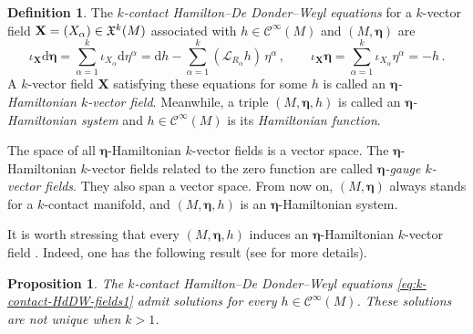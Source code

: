 \documentclass[11pt,twoside]{article}
\theoremstyle{plain}
\newtheorem{proposition}[theorem]{Proposition} \newtheorem{corollary}[theorem]{Corollary}
\theoremstyle{definition}
\newtheorem{definition}[theorem]{Definition}
\theoremstyle{remark}
\newcommand{\dd}{\mathrm{d}}
\newcommand{\Cinfty}{\mathscr{C}^\infty}
\newcommand*{\inn}[1]{\iota_{#1}}
\newcommand{\Lie}{\mathscr{L}}
\begin{document}
\begin{definition}
The {\it $k$-contact Hamilton--De Donder--Weyl equations} for a $k$-vector field
${\bf X} = (X_\alpha) \in \mathfrak{X}^k(M)$ associated with $h\in \Cinfty(M)$ and $(M,\bm \eta)$ are
\begin{equation}\label{eq:k-contact-HdDW-fields1}
\iota_{\bm X}\dd\bm\eta=\sum_{\alpha=1}^k \inn{X_\alpha} \dd \eta^\alpha
= \dd h - \sum_{\alpha=1}^k (\Lie_{R_\alpha} h)\, \eta^\alpha\,,\qquad
\iota_{\bm X}\bm\eta=\sum_{\alpha=1}^k \inn{X_\alpha} \eta^\alpha
= -h \,.
\end{equation}
A $k$-vector field ${\bm X}$ satisfying these equations for some $h$ is called an
\textit{${\bm \eta}$-Hamiltonian $k$-vector field}. Meanwhile, a triple $(M,\bm \eta,h)$ is called an {\it $\bm\eta$-Hamiltonian system} and $h \in \Cinfty(M)$ is its \textit{Hamiltonian function}.
\end{definition}

The space of all $\bm \eta$-Hamiltonian $k$-vector fields is a vector space. The $\bm \eta$-Hamiltonian $k$-vector fields related to the zero function are called {\it $\bm\eta$-gauge $k$-vector fields}. They also span a vector space. From now on, $(M,\bm\eta)$ always stands for a $k$-contact manifold, and $(M,\bm\eta,h)$ is an ${\bm \eta}$-Hamiltonian system. 

It is worth stressing that every $(M,\bm \eta,h)$ induces an ${\bm \eta}$-Hamiltonian $k$-vector field \cite{HLM_26,Riv_22}. Indeed, one has the following result (see \cite[Theorem 3.6]{HLM_26} for more details).

\begin{proposition}\label{prop:k-contact-HdDW-have-solutions}
The $k$-contact Hamilton--De Donder--Weyl equations
\eqref{eq:k-contact-HdDW-fields1} admit solutions for every $h\in \Cinfty(M)$. These solutions are not unique when $k>1$.
\end{proposition}
\end{document}
